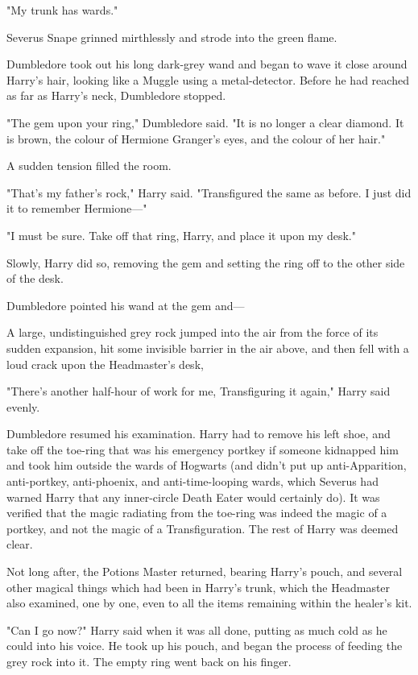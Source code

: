 "My trunk has wards."

Severus Snape grinned mirthlessly and strode into the green flame.

Dumbledore took out his long dark-grey wand and began to wave it close around
Harry's hair, looking like a Muggle using a metal-detector. Before he had
reached as far as Harry's neck, Dumbledore stopped.

"The gem upon your ring," Dumbledore said. "It is no longer a clear diamond. It
is brown, the colour of Hermione Granger's eyes, and the colour of her hair."

A sudden tension filled the room.

"That's my father's rock," Harry said. "Transfigured the same as before. I just
did it to remember Hermione---"

"I must be sure. Take off that ring, Harry, and place it upon my desk."

Slowly, Harry did so, removing the gem and setting the ring off to the other
side of the desk.

Dumbledore pointed his wand at the gem and---

A large, undistinguished grey rock jumped into the air from the force of its
sudden expansion, hit some invisible barrier in the air above, and then fell
with a loud crack upon the Headmaster's desk,

"There's another half-hour of work for me, Transfiguring it again," Harry said
evenly.

Dumbledore resumed his examination. Harry had to remove his left shoe, and take
off the toe-ring that was his emergency portkey if someone kidnapped him and
took him outside the wards of Hogwarts (and didn't put up anti-Apparition,
anti-portkey, anti-phoenix, and anti-time-looping wards, which Severus had
warned Harry that any inner-circle Death Eater would certainly do). It was
verified that the magic radiating from the toe-ring was indeed the magic of a
portkey, and not the magic of a Transfiguration. The rest of Harry was deemed
clear.

Not long after, the Potions Master returned, bearing Harry's pouch, and several
other magical things which had been in Harry's trunk, which the Headmaster also
examined, one by one, even to all the items remaining within the healer's kit.

"Can I go now?" Harry said when it was all done, putting as much cold as he
could into his voice. He took up his pouch, and began the process of feeding
the grey rock into it. The empty ring went back on his finger.

